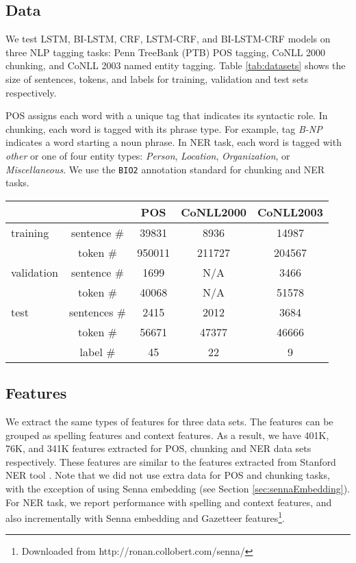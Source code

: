 \documentclass[11pt,a4paper]{article}
\begin{document}
\subsection{Data}
We test LSTM, BI-LSTM, CRF, LSTM-CRF, and BI-LSTM-CRF models on three NLP tagging tasks: Penn TreeBank (PTB) POS tagging, CoNLL 2000 chunking, and CoNLL 2003 named entity tagging. Table \ref{tab:datasets} shows the size of sentences, tokens, and labels for training, validation and test sets  respectively.

POS assigns each word with a unique tag that indicates its syntactic role. In chunking, each word is tagged with its phrase type. For example, tag \textit{B-NP} indicates a word starting a noun phrase. In NER task, each word is tagged with \textit{other} or one of four entity types: \textit{Person}, \textit{Location}, \textit{Organization}, or \textit{Miscellaneous}. We use the \texttt{BIO2} annotation standard for chunking and NER tasks.  

\begin{table*}[!hbt]
\begin{center} 
\caption{Size of sentences, tokens, and labels for training, validation and test sets.}
\label{tab:datasets}
\begin{tabular}{l|c|c|c|c}
\hline
& & POS & CoNLL2000 & CoNLL2003 \\ \hline
training & sentence \# & 39831 & 8936 & 14987 \\
             & token \# & 950011 & 211727 & 204567 \\ \hline
validation & sentence \# & 1699 & N/A & 3466 \\
             & token \# & 40068 & N/A & 51578 \\ \hline
test       & sentences \# & 2415 & 2012 & 3684 \\
            & token \# & 56671 & 47377 & 46666 \\ \hline
            & label \# & 45 & 22 & 9 \\ \hline
\end{tabular}
\end{center}
\end{table*}

\subsection{Features} \label{sec:features}
We extract the same types of features for three data sets. The features can be grouped as spelling features and context features. As a result, we have 401K, 76K, and 341K features extracted for POS,  chunking and  NER data sets respectively. These features are similar to the features extracted from Stanford NER tool \cite{finkel1,wang1}. Note that we did not use extra data for POS and chunking tasks, with the exception of using Senna embedding (see Section \ref{sec:sennaEmbedding}). For NER task, we report performance with spelling and context features,  and also incrementally with Senna embedding and Gazetteer features\footnote{Downloaded from http://ronan.collobert.com/senna/}.
\end{document}
